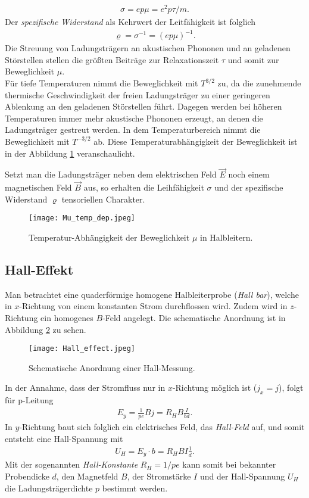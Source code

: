 \begin{align}
\sigma=ep\mu=e^2p\tau/m.
\end{align}
Der \emph{spezifische Widerstand} als Kehrwert der Leitfähigkeit ist folglich
\begin{align}
\varrho=\sigma^{-1}=(ep\mu)^{-1}.
\end{align}
Die Streuung von Ladungsträgern an akustischen Phononen und an geladenen Störstellen stellen die größten Beiträge zur Relaxationszeit $\tau$ und somit   zur Beweglichkeit $\mu$.\\
Für tiefe Temperaturen nimmt die Beweglichkeit mit $T^{3/2}$ zu, da die zunehmende thermische Geschwindigkeit der freien Ladungsträger zu einer geringeren Ablenkung an den geladenen Störstellen führt. Dagegen werden bei höheren Temperaturen immer mehr akustische Phononen erzeugt, an denen die Ladungsträger gestreut werden. In dem Temperaturbereich nimmt die Beweglichkeit mit $T^{-3/2}$ ab. Diese Temperaturabhängigkeit der Beweglichkeit ist in der Abbildung \ref{fig:mu-temp_dep} veranschaulicht.

Setzt man die Ladungsträger neben dem elektrischen Feld $\vec{E}$ noch einem magnetischen Feld $\vec{B}$ aus, so erhalten die Leihfähigkeit $\sigma$ und der spezifische Widerstand $\varrho$ tensoriellen Charakter.
\enlargethispage{3em}
\begin{figure}[h!]
\centering
\texttt{[image: Mu\_temp\_dep.jpeg]}
\caption{Temperatur-Abhängigkeit der Beweglichkeit $\mu$ in Halbleitern. \cite{lit:GroMa14}}
\label{fig:mu-temp_dep}
\end{figure}

\newpage
\subsection{Hall-Effekt}
Man betrachtet eine quaderförmige homogene Halbleiterprobe (\emph{Hall bar}), welche in $x$-Richtung von einem konstanten Strom durchflossen wird. Zudem wird in $z$-Richtung ein homogenes $B$-Feld angelegt. Die schematische Anordnung ist in Abbildung \ref{fig:hall-effect} zu sehen.
\begin{figure}[h]
\centering
\texttt{[image: Hall\_effect.jpeg]}
\caption{Schematische Anordnung einer Hall-Messung. \cite{lit:Iba09}}
\label{fig:hall-effect}
\end{figure}

In der Annahme, dass der Stromfluss nur in $x$-Richtung möglich ist ($j_x=j$), folgt für p-Leitung
\begin{align}
E_y=\frac{1}{pe}Bj=R_H B\frac{I}{bd}.
\end{align}
In $y$-Richtung baut sich folglich ein elektrisches Feld, das \emph{Hall-Feld} auf, und somit entsteht eine Hall-Spannung mit
\begin{align}
U_H=E_y\cdot b=R_H B I\frac{1}{d}.
\end{align}
Mit der sogenannten \emph{Hall-Konstante} $R_H=1/pe$ kann somit bei bekannter Probendicke $d$, den Magnetfeld $B$, der Stromstärke $I$ und der Hall-Spannung $U_H$ die Ladungsträgerdichte $p$ bestimmt werden.

